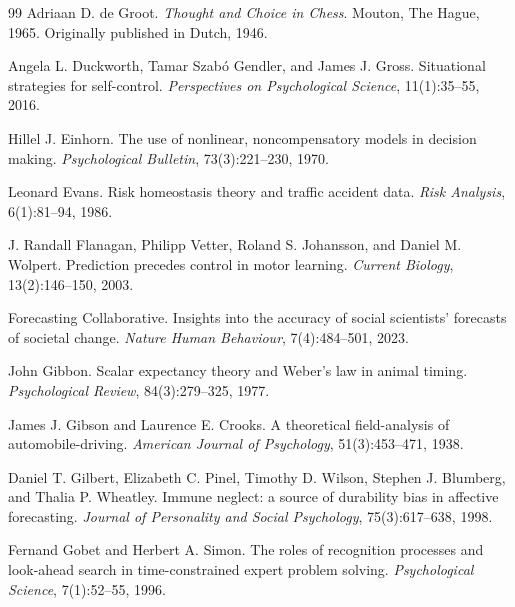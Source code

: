 \documentclass[11pt,a4paper]{article}
\theoremstyle{remark}
\begin{document}
\begin{thebibliography}{99}
Adriaan D. de Groot.
\newblock \emph{Thought and Choice in Chess}.
\newblock Mouton, The Hague, 1965. Originally published in Dutch, 1946.

Angela L. Duckworth, Tamar Szab\'o Gendler, and James J. Gross.
\newblock Situational strategies for self-control.
\newblock \emph{Perspectives on Psychological Science}, 11(1):35--55, 2016.

Hillel J. Einhorn.
\newblock The use of nonlinear, noncompensatory models in decision making.
\newblock \emph{Psychological Bulletin}, 73(3):221--230, 1970.

Leonard Evans.
\newblock Risk homeostasis theory and traffic accident data.
\newblock \emph{Risk Analysis}, 6(1):81--94, 1986.

J. Randall Flanagan, Philipp Vetter, Roland S. Johansson, and Daniel M. Wolpert.
\newblock Prediction precedes control in motor learning.
\newblock \emph{Current Biology}, 13(2):146--150, 2003.

Forecasting Collaborative.
\newblock Insights into the accuracy of social scientists' forecasts of societal change.
\newblock \emph{Nature Human Behaviour}, 7(4):484--501, 2023.

John Gibbon.
\newblock Scalar expectancy theory and Weber's law in animal timing.
\newblock \emph{Psychological Review}, 84(3):279--325, 1977.

James J. Gibson and Laurence E. Crooks.
\newblock A theoretical field-analysis of automobile-driving.
\newblock \emph{American Journal of Psychology}, 51(3):453--471, 1938.

Daniel T. Gilbert, Elizabeth C. Pinel, Timothy D. Wilson, Stephen J. Blumberg, and Thalia P. Wheatley.
\newblock Immune neglect: a source of durability bias in affective forecasting.
\newblock \emph{Journal of Personality and Social Psychology}, 75(3):617--638, 1998.

Fernand Gobet and Herbert A. Simon.
\newblock The roles of recognition processes and look-ahead search in time-constrained expert problem solving.
\newblock \emph{Psychological Science}, 7(1):52--55, 1996.


\end{thebibliography}
\end{document}
